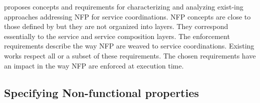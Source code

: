 \cite{ScCM10} proposes concepts and requirements for characterizing and analyzing exist-ing approaches addressing NFP for service coordinations. 
%
%
NFP concepts are close to those defined by \cite{Souz12} but they are not organized into layers.  They correspond essentially to the service and service composition layers. The enforcement requirements describe the way NFP are weaved to service coordinations. Existing works respect all or a subset of these requirements. The chosen requirements have an impact in the way NFP are enforced at execution time.



\subsection{Specifying Non-functional properties}

